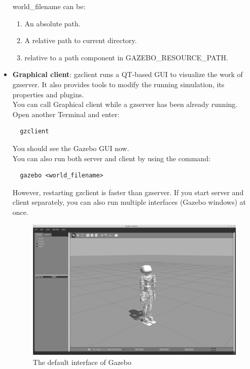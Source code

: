 \documentclass[pdftex,12pt,a4paper]{article}
\begin{document}
\begin{itemize}
  \newpage
  world\_filename can be:
  \begin{enumerate}
  \item An absolute path.
  \item A relative path to current directory.
  \item relative to a path component in GAZEBO\_RESOURCE\_PATH.
  \end{enumerate}
  \item \textbf{Graphical client}: gzclient runs a QT-based GUI to visualize the work of gzserver. It also provides tools to modify the running simulation, its properties and plugins.\\
  You can call Graphical client while a gzserver has been already running. Open another Terminal and enter:
  \begin{lstlisting}
  gzclient
  \end{lstlisting}
  You should see the Gazebo GUI now.\\
  You can also run both server and client by using the command:
  \begin{lstlisting}
  gazebo <world_filename>
  \end{lstlisting}
  However, restarting gzclient is faster than gzserver. If you start server and client separately, you can also run multiple interfaces (Gazebo windows) at once.
  \begin{figure}[h]
      \centering
      \includegraphics[width=0.9\linewidth]{image/gazebo_default.png}
      \caption{The default interface of Gazebo}
      \label{fig:gazebo_default}
  \end{figure}
  
  \end{itemize}
  
\end{document}
